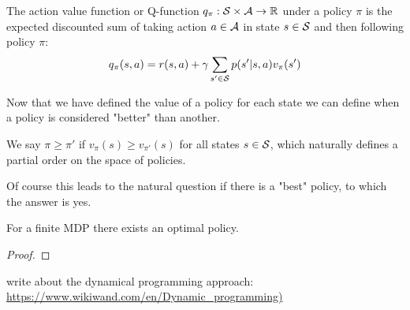 \begin{definition}
    \label{def:q}
    The action value function or Q-function $q_\pi: \S \times \A \to \R$ under a policy $\pi$ is the expected discounted sum of taking action $a \in \A$ in state $s \in \S$ and then following policy $\pi$:
    $$q_\pi(s, a) = r(s, a) + \gamma \sum_{s' \in \S} p(s' | s, a) v_\pi(s')$$
\end{definition}

Now that we have defined the value of a policy for each state we can define when a policy is considered "better" than another.

\begin{definition}
    \label{def:policy-order}
    We say $\pi \ge \pi'$ if $v_\pi(s) \ge v_{\pi'}(s)$ for all states $s \in \S$, which naturally defines a partial order on the space of policies.
\end{definition}

Of course this leads to the natural question if there is a "best" policy, to which the answer is yes.

\begin{proposition}
    \label{prop:optimal-policy}
    For a finite MDP there exists an optimal policy.
\end{proposition}

\begin{proof}
    \todo
\end{proof}

\begin{notes}
    write about the dynamical programming approach: \url{https://www.wikiwand.com/en/Dynamic_programming)}
\end{notes}
